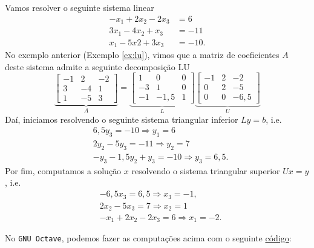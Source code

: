 \begin{ex}\label{ex:lu}
  Vamos resolver o seguinte sistema linear
  \begin{align}
    -x_1 + 2x_2 - 2x_3 &= 6\\
    3x_1 - 4x_2 + x_3 &= -11\\
    x_1 - 5x2 + 3x_3 &= -10.
  \end{align}
  No exemplo anterior (Exemplo \ref{ex:lu}), vimos que a matriz de coeficientes $A$ deste sistema admite a seguinte decomposição LU
  \begin{equation}
    \underbrace{\begin{bmatrix}
      -1 & 2 & -2\\
      3 & -4 & 1\\
      1 & -5 & 3
    \end{bmatrix}}_{A} =
  \underbrace{\begin{bmatrix}
      1 & 0 & 0\\
      -3 & 1 & 0\\
      -1 & -1,5 & 1
    \end{bmatrix}}_{L}
  \underbrace{\begin{bmatrix}
      -1 & 2 & -2\\
      0 & 2 & -5\\
      0 & 0 & -6,5
    \end{bmatrix}}_{U}
  \end{equation}
  Daí, iniciamos resolvendo o seguinte sistema triangular inferior $Ly = b$, i.e.
  \begin{align}
    &6,5y_3 = -10 \Rightarrow y_1 = 6\\
    &2y_2 - 5y_3 = -11 \Rightarrow y_2 = 7\\
    &-y_3 - 1,5y_2 + y_3 = -10 \Rightarrow y_3 = 6,5.
  \end{align}
  Por fim, computamos a solução $x$ resolvendo o sistema triangular superior $Ux=y$, i.e.
  \begin{align}
    &-6,5x_3 = 6,5 \Rightarrow x_3 = -1,\\
    &2x_2 - 5x_3 = 7 \Rightarrow x_2 = 1\\
    &-x_1 + 2x_2 - 2x_3 = 6 \Rightarrow x_1 = -2.
  \end{align}

\ifisoctave
No \verb+GNU Octave+, podemos fazer as computações acima com o seguinte \href{https://github.com/phkonzen/notas/blob/master/src/MatematicaNumerica/cap_sl_direto/dados/ex_lu/ex_lu.m}{código}:

\fi
\end{ex}

